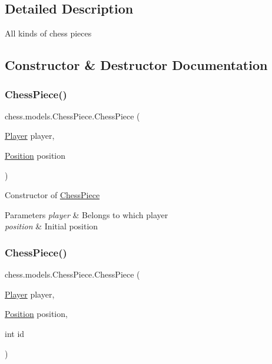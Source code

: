 \subsection{Detailed Description}
All kinds of chess pieces 

\subsection{Constructor \& Destructor Documentation}
\mbox{\label{classchess_1_1models_1_1_chess_piece_a59beae5e1f384747a201a4c417ca0afb}} 
\subsubsection{\texorpdfstring{Chess\+Piece()}{ChessPiece()}\hspace{0.1cm}{\footnotesize\ttfamily [1/2]}}
{\footnotesize\ttfamily chess.\+models.\+Chess\+Piece.\+Chess\+Piece (\begin{DoxyParamCaption}\item[{\mbox{\hyperlink{enumchess_1_1models_1_1enums_1_1_player}{Player}}}]{player,  }\item[{\mbox{\hyperlink{classchess_1_1models_1_1_position}{Position}}}]{position }\end{DoxyParamCaption})}

Constructor of \mbox{\hyperlink{classchess_1_1models_1_1_chess_piece}{Chess\+Piece}}


\begin{DoxyParams}{Parameters}
{\em player} & Belongs to which player \\
\hline
{\em position} & Initial position \\
\hline
\end{DoxyParams}
\mbox{\label{classchess_1_1models_1_1_chess_piece_aeea9d0c376842325301238b95cabe85c}} 
\subsubsection{\texorpdfstring{Chess\+Piece()}{ChessPiece()}\hspace{0.1cm}{\footnotesize\ttfamily [2/2]}}
{\footnotesize\ttfamily chess.\+models.\+Chess\+Piece.\+Chess\+Piece (\begin{DoxyParamCaption}\item[{\mbox{\hyperlink{enumchess_1_1models_1_1enums_1_1_player}{Player}}}]{player,  }\item[{\mbox{\hyperlink{classchess_1_1models_1_1_position}{Position}}}]{position,  }\item[{int}]{id }\end{DoxyParamCaption})}



